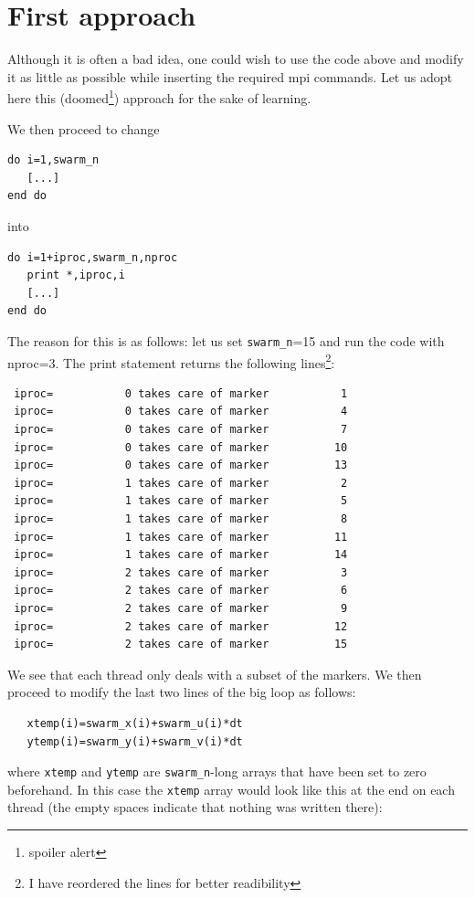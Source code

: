 \section*{First approach}

Although it is often a bad idea, one could wish to use the code above and
modify it as little as possible while inserting the required mpi commands. Let us 
adopt here this (doomed\footnote{spoiler alert}) approach for the sake of learning.

We then proceed to change 
\begin{verbatim}
do i=1,swarm_n
   [...]
end do
\end{verbatim}
into
\begin{verbatim}
do i=1+iproc,swarm_n,nproc
   print *,iproc,i
   [...]
end do
\end{verbatim}
The reason for this is as follows: let us set \verb|swarm_n|=15 and run the code with nproc=3.
The print statement returns the following lines\footnote{I have reordered the lines
for better readibility}:
\begin{verbatim}
 iproc=           0 takes care of marker           1
 iproc=           0 takes care of marker           4
 iproc=           0 takes care of marker           7
 iproc=           0 takes care of marker          10
 iproc=           0 takes care of marker          13
 iproc=           1 takes care of marker           2
 iproc=           1 takes care of marker           5
 iproc=           1 takes care of marker           8
 iproc=           1 takes care of marker          11
 iproc=           1 takes care of marker          14
 iproc=           2 takes care of marker           3
 iproc=           2 takes care of marker           6
 iproc=           2 takes care of marker           9
 iproc=           2 takes care of marker          12
 iproc=           2 takes care of marker          15
\end{verbatim}
We see that each thread only deals with a subset of the markers.
We then proceed to modify the last two lines of the big loop as follows:
\begin{verbatim}
   xtemp(i)=swarm_x(i)+swarm_u(i)*dt
   ytemp(i)=swarm_y(i)+swarm_v(i)*dt
\end{verbatim}
where \verb|xtemp| and \verb|ytemp| are \verb|swarm_n|-long arrays that have been set to zero beforehand.  
In this case the \verb|xtemp| array would look like this at the end on each thread (the empty spaces indicate
that nothing was written there):
